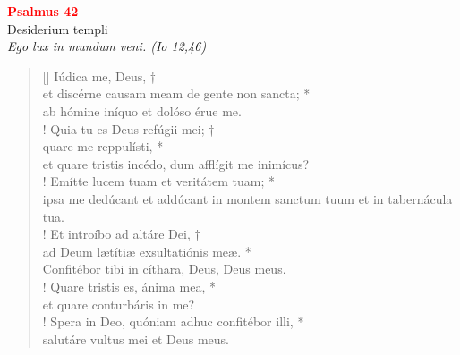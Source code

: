 


\def\greinitialformat#1{%
{\fontsize{39}{39}\selectfont #1}%
}




\vspace{0.3cm}
\begin{center}
 \textcolor{red}{\large \bf Psalmus 42}\\
Desiderium templi\\
\textit{\small Ego lux in mundum veni. (Io 12,46)}
\end{center}
\begin{verse}[\versewidth]
Iúdica me, Deus, †\\
et discérne causam meam de gente non sancta; *\\
ab hómine iníquo et dolóso érue me.\\!
\vin Quia tu es Deus refúgii mei; †\\
\vin quare me reppulísti, *\\
\vin et quare tristis incédo, dum afflígit me inimícus?\\!
Emítte lucem tuam et veritátem tuam; *\\
ipsa me dedúcant et addúcant in montem sanctum tuum et in tabernácula tua.\\!
\vin Et introíbo ad altáre Dei, †\\
\vin ad Deum lætítiæ exsultatiónis meæ. *\\
\vin Confitébor tibi in cíthara, Deus, Deus meus.\\!
Quare tristis es, ánima mea, *\\
et quare conturbáris in me?\\!
\vin Spera in Deo, quóniam adhuc confitébor illi, *\\
\vin salutáre vultus mei et Deus meus.\\
\end{verse}
\vspace{1cm}


